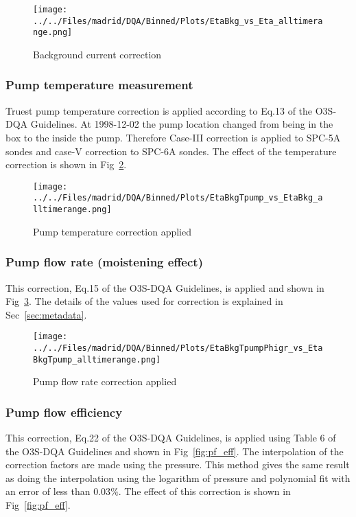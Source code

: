                 \begin{figure}
        \centering
\texttt{[image: ../../Files/madrid/DQA/Binned/Plots/EtaBkg\_vs\_Eta\_alltimerange.png]}
    \caption{Background current correction}
            \label{fig:bkg}
    \end{figure}
%
            \subsubsection{Pump temperature measurement}
 Truest pump temperature correction is applied according to Eq.13 of the O3S-DQA Guidelines. At 1998-12-02 the pump location
 changed from being in the box to the inside the pump.
    Therefore Case-III correction is applied to SPC-5A sondes and case-V correction to SPC-6A sondes. The effect of the temperature correction
is shown in  Fig~\ref{fig:tpump}.
%
%
                    \begin{figure}
        \centering
\texttt{[image: ../../Files/madrid/DQA/Binned/Plots/EtaBkgTpump\_vs\_EtaBkg\_alltimerange.png]}
    \caption{Pump temperature correction applied}
            \label{fig:tpump}
    \end{figure}
%
                \subsubsection{Pump flow rate (moistening effect)}
    This correction, Eq.15 of the O3S-DQA Guidelines, is applied and shown in Fig~\ref{fig:pf_ptu}. The details of the values used for
    correction is explained in Sec~\ref{sec:metadata}.

                        \begin{figure}
        \centering
\texttt{[image: ../../Files/madrid/DQA/Binned/Plots/EtaBkgTpumpPhigr\_vs\_EtaBkgTpump\_alltimerange.png]}
    \caption{Pump flow rate correction applied}
            \label{fig:pf_ptu}
    \end{figure}
%
                   \subsubsection{Pump flow efficiency}
    This correction, Eq.22 of the O3S-DQA Guidelines, is applied using Table 6 of the O3S-DQA Guidelines and shown in Fig~\ref{fig:pf_eff}.
The interpolation of the correction factors are made using the pressure. This method gives the same result as doing the interpolation using the logarithm of pressure
and polynomial fit with an error of less than $0.03\%$. The effect of this correction is shown in Fig~\ref{fig:pf_eff}.

